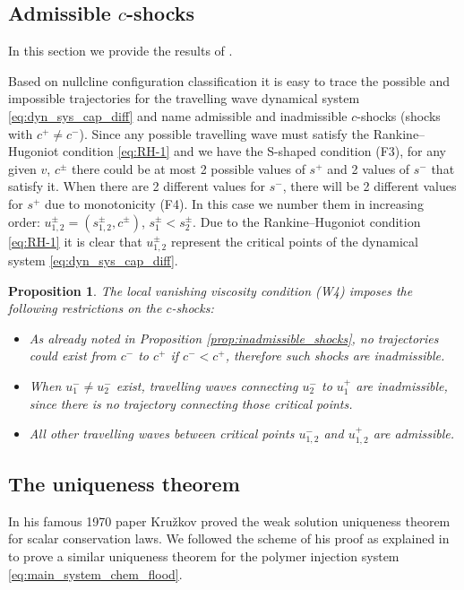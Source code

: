 \documentclass[12pt]{article}
\newtheorem{proposition}{Proposition}
\theoremstyle{definition}
\begin{document}
\subsection{Admissible $c$-shocks}
\label{sec:sec2-nullclines}

In this section we provide the results of \cite[Sect.~3.3]{MR2024}.

Based on nullcline configuration classification it is easy to trace the possible and impossible trajectories for the travelling wave dynamical system \eqref{eq:dyn_sys_cap_diff} and name admissible and inadmissible $c$-shocks (shocks with $c^+\neq c^-$). Since any possible travelling wave must satisfy the Rankine--Hugoniot condition \eqref{eq:RH-1} and we have the S-shaped condition (F3), for any given $v$, $c^\pm$ there could be at most 2 possible values of $s^+$ and 2 values of $s^-$ that satisfy it. When there are 2 different values for $s^-$, there will be 2 different values for $s^+$ due to monotonicity (F4). In this case we number them in increasing order: $u_{1, 2}^\pm = (s_{1,2}^\pm, c^\pm)$, $s_1^\pm < s_2^\pm$. Due to the Rankine--Hugoniot condition \eqref{eq:RH-1} it is clear that $u_{1,2}^\pm$ represent the critical points of the dynamical system \eqref{eq:dyn_sys_cap_diff}.
\begin{proposition}
\label{prop:c-shock-admissibility}
The local vanishing viscosity condition (W4) imposes the following restrictions on the $c$-shocks:
\begin{itemize}
    \item As already noted in Proposition \ref{prop:inadmissible_shocks}, no trajectories could exist from $c^-$ to $c^+$ if $c^- < c^+$, therefore such shocks are inadmissible.
    \item When $u_1^- \neq u_2^-$ exist, travelling waves connecting $u_2^-$ to $u_1^+$ are inadmissible, since there is no trajectory connecting those critical points.
    \item All other travelling waves between critical points $u^-_{1,2}$ and $u^+_{1,2}$ are admissible.
\end{itemize}
\end{proposition}

\subsection{The uniqueness theorem}
\label{sec:uniqueness}

In his famous 1970 paper \cite{Kruzhkov} Kru\v{z}kov proved the weak solution uniqueness theorem for scalar conservation laws. We followed the scheme of his proof as explained in \cite{Serre1} to prove a similar uniqueness theorem for the polymer injection system \eqref{eq:main_system_chem_flood}.
\end{document}
